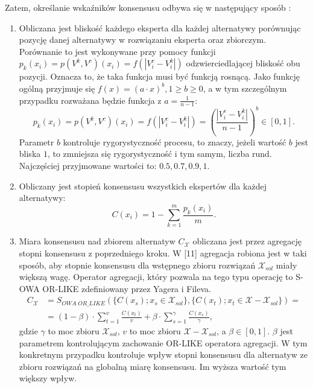 Zatem, określanie wskaźników konsensusu odbywa się w następujący sposób
\cite{Herrera-Viedma2002}:
\begin{enumerate}
  \item Obliczana jest bliskość każdego eksperta dla każdej alternatywy
  porównując pozycję danej alternatywy w rozwiązaniu eksperta oraz zbiorczym.
  Porównanie to jest wykonywane przy pomocy funkcji $p_k(x_i) = p(V^k,V^c)(x_i)
  = f(|V^c_i - V^k_i|)$ odzwierciedlającej bliskość obu pozycji. Oznacza to, że
  taka funkcja musi być funkcją rosnącą. Jako funkcję ogólną przyjmuje się
  $f(x) = (a \cdot x)^b, 1 \geq b \geq 0$, a w tym szczególnym przypadku
  rozważana będzie funkcja z $a = \frac{1}{n-1}$:
  \begin{equation}
  p_k(x_i) = p(V^k,V^c)(x_i) = f(|V^c_i - V^k_i|) = (\frac{|V^c_i -
  V^k_i|}{n-1})^b \in [0,1].
  \end{equation}
  Parametr $b$ kontroluje rygorystyczność procesu, to znaczy, jeżeli wartość $b$
  jest bliska $1$, to zmniejsza się rygorystyczność i tym samym, liczba rund.
  Najczęściej przyjmowane wartości to: $0.5, 0.7, 0.9, 1$.
  
  \item Obliczany jest stopień konsensusu wszystkich ekspertów dla każdej
  alternatywy:
  \begin{equation}
  C(x_i) = 1 - \sum_{k=1}^{m} \frac{p_k(x_i)}{m}.
  \end{equation}
  
  \item Miara konsensusu nad zbiorem alternatyw $C_{\mathcal{X}}$ obliczana jest
  przez agregację stopni konsensusu z poprzedniego kroku. W [11] agregacja
  robiona jest w taki sposób, aby stopnie konsensusu dla wstępnego zbioru
  rozwiązań $\mathcal{X}_{sol}$ miały większą wagę. Operator agregacji, który
  pozwala na tego typu operację to S-OWA OR-LIKE zdefiniowany przez Yagera i
  Fileva.
  \begin{equation}
  \begin{split}
  C_{\mathcal{X}} &= S_{OWA \; OR\_LIKE}(\{ C(x_s); x_s \in
  \mathcal{X}_{sol}\}, \{ C(x_t); x_t \in \mathcal{X} - \mathcal{X}_{sol} \}) =
  \\ 
  &= (1 - \beta)\cdot \sum_{t=1}^{v} \frac{C(x_t)}{v} + \beta \cdot
  \sum_{s=1}^{\gamma} \frac{C(x_s)}{\gamma},
  \end{split}
  \end{equation}
  gdzie $\gamma$ to moc zbioru $\mathcal{X}_{sol}$, $v$ to moc zbioru
  $\mathcal{X} - \mathcal{X}_{sol}$, a $\beta \in [0,1].$ $\beta$ jest
  parametrem kontrolującym zachowanie OR-LIKE operatora agregacji. W tym
  konkretnym przypadku kontroluje wpływ stopni konsensusu dla alternatyw ze
  zbioru rozwiązań na globalną miarę konsensusu. Im wyższa wartość tym większy
  wpływ.
  

\end{enumerate}
